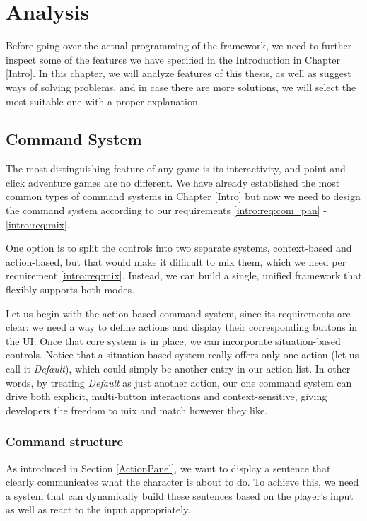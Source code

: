 \chapter{Analysis}

Before going over the actual programming of the framework, we need to further inspect some of the features we have specified in the Introduction in Chapter \ref{Intro}. In this chapter, we will analyze features of this thesis, as well as suggest ways of solving problems, and in case there are more solutions, we will select the most suitable one with a proper explanation.

\section{Command System}
The most distinguishing feature of any game is its interactivity, and point-and-click adventure games are no different. We have already established the most common types of command systems in Chapter \ref{Intro} but now we need to design the command system according to our requirements \ref{intro:req:com_pan} - \ref{intro:req:mix}. 

One option is to split the controls into two separate systems, context-based and action-based, but that would make it difficult to mix them, which we need per requirement \ref{intro:req:mix}. Instead, we can build a single, unified framework that flexibly supports both modes.

Let us begin with the action-based command system, since its requirements are clear: we need a way to define actions and display their corresponding buttons in the UI. Once that core system is in place, we can incorporate situation-based controls. Notice that a situation-based system really offers only one action (let us call it \textit{Default}), which could simply be another entry in our action list. In other words, by treating \textit{Default} as just another action, our one command system can drive both explicit, multi-button interactions and context-sensitive, giving developers the freedom to mix and match however they like.

\subsection{Command structure}
\label{Analysis:CommandStructure}
As introduced in Section \ref{ActionPanel}, we want to display a sentence that clearly communicates what the character is about to do. To achieve this, we need a system that can dynamically build these sentences based on the player's input as well as react to the input appropriately.

